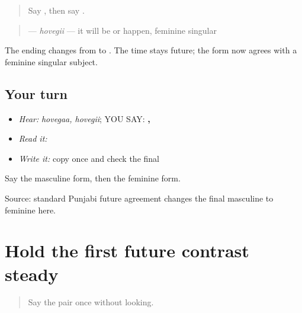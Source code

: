 \label{lesson:PA-C186-hovegi}



\begin{quote}
Say \textbf{}, then say \textbf{}.
\end{quote}

\begin{grammarlens}[title={Grammar Lens: change only the agreement ending}]
\begin{quote}
\textbf{} — \emph{hovegii} — it will be or happen, feminine singular
\end{quote}

The ending changes from \textbf{} to \textbf{}. The time stays future; the form now agrees with a feminine singular subject.
\end{grammarlens}

\subsection*{Your turn}
\begin{itemize}
\raggedright
  \item \emph{Hear:} \emph{hovegaa, hovegii}; YOU SAY: \textbf{, }
  \item \emph{Read it:} \textbf{ }
  \item \emph{Write it:} copy \textbf{} once and check the final \textbf{}
\end{itemize}

\begin{tcolorbox}[breakable,colback=teal!4,colframe=teal!35!black,title={Before you move on}]
Say the masculine form, then the feminine form.

Source: standard Punjabi future agreement changes the final masculine \textbf{} to feminine \textbf{} here.
\end{tcolorbox}
\section[\texorpdfstring{\pa{ਹੋਵੇਗਾ} · \pa{ਹੋਵੇਗੀ} (hovegaa / hovegii)}{ਹੋਵੇਗਾ · ਹੋਵੇਗੀ (hovegaa / hovegii)}]{Hold the first future contrast steady}

\label{lesson:PA-C186-hovega-hovegi-review}



\begin{quote}
Say the pair once without looking.
\end{quote}

